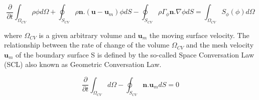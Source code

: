 \documentclass[10pt,a4paper,twoside]{article}
\begin{document}
\begin{equation}\label{momentum}
\frac{\partial}{\partial t}\int_{\Omega_{CV}}^{}\rho \phi d\Omega + \oint_{S_{CV}} \rho \textbf{n}.(\textbf{u}-\textbf{u}_m)\phi dS - \oint_{S_{CV}} \rho \Gamma_{\phi} \textbf{n}.\nabla \phi dS = \int_{\Omega_{CV}} S_{\phi} (\phi) d\Omega
\end{equation}

where $\Omega_{CV}$ is a given arbitrary volume and $\textbf{u}_m$ the moving surface velocity. The relationship between the rate of change of the volume $\Omega_{CV}$ and the mesh velocity $\textbf{u}_m$  of the boundary surface S is defined by the so-called Space Conversation Law (SCL) also known as Geometric Conversation Law.

\begin{equation}
\frac{\partial}{\partial t}\int_{\Omega_{CV}}^{} d\Omega - \oint_{S_{CV}} \textbf{n}.\textbf{u}_m dS  = 0
\end{equation}
\end{document}
